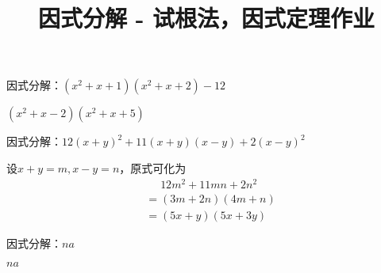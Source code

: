 \documentclass[windows,csize4]{BHCexam}
\title{因式分解 - 试根法，因式定理作业}
\begin{document}
\maketitle


\begin{groups}
    \begin{questions}[]

        \question[5] 因式分解：$(x^2+x+1)(x^2+x+2)-12$
        \begin{solution}{0.5cm}
            \methodonly $(x^2+x-2)(x^2+x+5)$
        \end{solution}
        \vspace{3.5cm}

        \question[5] 因式分解：$12(x+y)^2+11(x+y)(x-y)+2(x-y)^2$
        \begin{solution}{0.5cm}
            \methodonly 设$x+y=m,x-y=n$，原式可化为
            \[
                \begin{aligned}
                     & \phantom{=}12m^2+11mn+2n^2 \\
                     & = (3m+2n)(4m+n)            \\
                     & = (5x+y)(5x+3y)
                \end{aligned}
            \]
        \end{solution}
        \vspace{3.5cm}

        \question[5] 因式分解：$na$
        \begin{solution}{0.5cm}
            \methodonly $na$
        \end{solution}
        \vspace{3.5cm}
    \end{questions}

\end{groups}


\label{lastpage}
\end{document}
